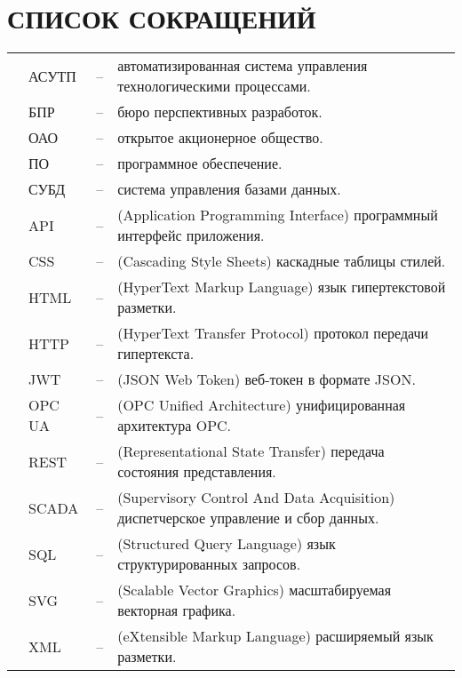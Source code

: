\sectionbreak \section*{ 
    \gostTitleFont
    \redline
    СПИСОК СОКРАЩЕНИЙ
}
\titlespace

{\gostFont

\begin{tabular}{p{0.85cm} p{1.75cm} p{0.3cm} p{131.5mm}}
    & АСУТП & {--} & автоматизированная система управления технологическими процессами. \\
    & БПР & {--} & бюро перспективных разработок. \\
    & ОАО & {--} & открытое акционерное общество. \\
    & ПО & {--} & программное обеспечение. \\
    & СУБД & {--} & система управления базами данных. \\
    & API & {--} & (Application Programming Interface) программный интерфейс приложения. \\
    & CSS & {--} & (Cascading Style Sheets) каскадные таблицы стилей. \\
    & HTML & {--} & (HyperText Markup Language) язык гипертекстовой разметки. \\
    & HTTP & {--} & (HyperText Transfer Protocol) протокол передачи гипертекста. \\
    & JWT & {--} & (JSON Web Token) веб-токен в формате JSON. \\
    & OPC UA & {--} & (OPC Unified Architecture) унифицированная архитектура OPC. \\
    & REST & {--} & (Representational State Transfer) передача состояния представления. \\
    & SCADA & {--} & (Supervisory Control And Data Acquisition) диспетчерское управление и сбор данных. \\
    & SQL & {--} & (Structured Query Language) язык структурированных запросов. \\
    & SVG & {--} & (Scalable Vector Graphics) масштабируемая векторная графика. \\
    & XML & {--} & (eXtensible Markup Language) расширяемый язык разметки. \\
\end{tabular}

}
